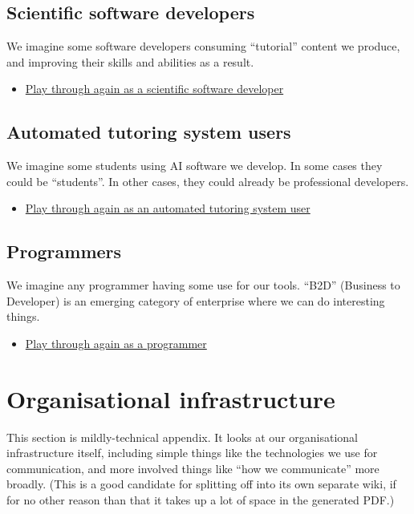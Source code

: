 \documentclass[11pt]{article}
\begin{document}
\subsection{Scientific software developers}
\label{sec:org803671d}
We imagine some software developers consuming “tutorial” content we
produce, and improving their skills and abilities as a result.

\begin{itemize}
\item \href{0caba40b-2561-4143-b2b1-55f3ddc3201b}{Play through again as a scientific software developer}
\end{itemize}
\subsection{Automated tutoring system users}
\label{sec:org7c6f880}
We imagine some students using AI software we develop.  In some cases
they could be “students”.  In other cases, they could already be
professional developers.

\begin{itemize}
\item \href{0caba40b-2561-4143-b2b1-55f3ddc3201b}{Play through again as an automated tutoring system user}
\end{itemize}
\subsection{Programmers}
\label{sec:orgbd7a449}
We imagine any programmer having some use for our tools.  “B2D”
(Business to Developer) is an emerging category of enterprise where we
can do interesting things.

\begin{itemize}
\item \href{0caba40b-2561-4143-b2b1-55f3ddc3201b}{Play through again as a programmer}
\end{itemize}
\section{Organisational infrastructure}
\label{sec:org75d752b}
This section is mildly-technical appendix.  It looks at our
organisational infrastructure itself, including simple things like the
technologies we use for communication, and more involved things like
“how we communicate” more broadly.  (This is a good candidate for
splitting off into its own separate wiki, if for no other reason than
that it takes up a lot of space in the generated PDF.)
\end{document}
